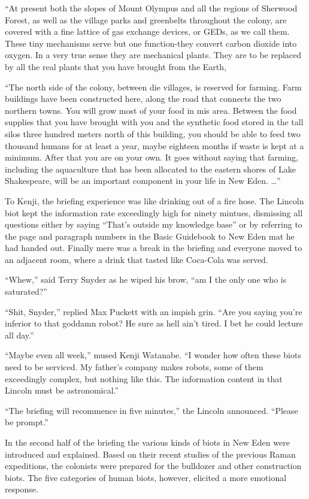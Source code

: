 \documentclass[]{article}
\begin{document}
{“At present both the slopes of Mount Olympus and all the regions of Sherwood Forest, as well as the village parks and greenbelts throughout the colony, are covered with a fine lattice of gas exchange devices, or GEDs, as we call them. These tiny mechanisms serve but one function-they convert carbon dioxide into oxygen. In a very true sense they are mechanical plants. They are to be replaced by all the real plants that you have brought from the Earth,

“The north side of the colony, between die villages, is reserved for farming. Farm buildings have been constructed here, along the road that connects the two northern towns. You will grow most of your food in mis area. Between the food supplies that you have brought with you and the synthetic food stored in the tall silos three hundred meters north of this building, you should be able to feed two thousand humans for at least a year, maybe eighteen months if waste is kept at a minimum. After that you are on your own. It goes without saying that farming, including the aquaculture that has been allocated to the eastern shores of Lake Shakespeare, will be an important component in your life in New Eden. …”

To Kenji, the briefing experience was like drinking out of a fire hose. The Lincoln biot kept the information rate exceedingly high for ninety mintues, dismissing all questions either by saying “That’s outside my knowledge base” or by referring to the page and paragraph numbers in the Basic Guidebook to New Eden mat he had handed out. Finally mere was a break in the briefing and everyone moved to an adjacent room, where a drink that tasted like Coca-Cola was served.

“Whew,” said Terry Snyder as he wiped his brow, “am I the only one who is saturated?”

“Shit, Snyder,” replied Max Puckett with an impish grin. “Are you saying you’re inferior to that goddamn robot? He sure as hell ain’t tired. I bet he could lecture all day.”

“Maybe even all week,” mused Kenji Watanabe. “I wonder how often these biots need to be serviced. My father’s company makes robots, some of them exceedingly complex, but nothing like this. The information content in that Lincoln must be astronomical.”

“The briefing will recommence in five minutes,” the Lincoln announced. “Please be prompt.”

In the second half of the briefing the various kinds of biots in New Eden were introduced and explained. Based on their recent studies of the previous Raman expeditions, the colonists were prepared for the bulldozer and other construction biots. The five categories of human biots, however, elicited a more emotional response.

}
\end{document}
